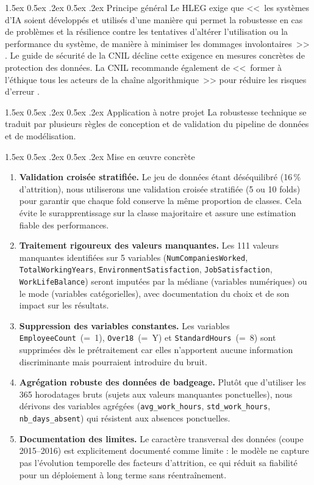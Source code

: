 \documentclass[12pt,a4paper]{article}
\makeatletter
\renewcommand\paragraph{\@startsection{paragraph}{4}{\z@}%
  {1.5ex \@plus 0.5ex \@minus .2ex}%
  {0.5ex \@plus .2ex}%
  {\normalfont\normalsize\bfseries}}
\makeatother
\begin{document}
\paragraph{Principe général}
Le HLEG exige que <<~les systèmes d'IA soient développés et utilisés d'une manière qui permet la robustesse en cas de problèmes et la résilience contre les tentatives d'altérer l'utilisation ou la performance du système, de manière à minimiser les dommages involontaires~>> \cite{ia_act}. Le guide de sécurité de la CNIL \cite{cnil_securite} décline cette exigence en mesures concrètes de protection des données. La CNIL recommande également de <<~former à l'éthique tous les acteurs de la chaîne algorithmique~>> pour réduire les risques d'erreur \cite{cnil_ethique}.

\paragraph{Application à notre projet}
La robustesse technique se traduit par plusieurs règles de conception et de validation du pipeline de données et de modélisation.

\paragraph{Mise en \oe uvre concrète}
\begin{enumerate}
    \item \textbf{Validation croisée stratifiée.} Le jeu de données étant déséquilibré (16\,\% d'attrition), nous utiliserons une validation croisée stratifiée (5 ou 10 folds) pour garantir que chaque fold conserve la même proportion de classes. Cela évite le surapprentissage sur la classe majoritaire et assure une estimation fiable des performances.
    \item \textbf{Traitement rigoureux des valeurs manquantes.} Les 111 valeurs manquantes identifiées sur 5 variables (\texttt{NumCompaniesWorked}, \texttt{TotalWorkingYears}, \texttt{EnvironmentSatisfaction}, \texttt{JobSatisfaction}, \texttt{WorkLifeBalance}) seront imputées par la médiane (variables numériques) ou le mode (variables catégorielles), avec documentation du choix et de son impact sur les résultats.
    \item \textbf{Suppression des variables constantes.} Les variables \texttt{EmployeeCount}~(=~1), \texttt{Over18}~(=~Y) et \texttt{StandardHours}~(=~8) sont supprimées dès le prétraitement car elles n'apportent aucune information discriminante mais pourraient introduire du bruit.
    \item \textbf{Agrégation robuste des données de badgeage.} Plutôt que d'utiliser les 365 horodatages bruts (sujets aux valeurs manquantes ponctuelles), nous dérivons des variables agrégées (\texttt{avg\_work\_hours}, \texttt{std\_work\_hours}, \texttt{nb\_days\_absent}) qui résistent aux absences ponctuelles.
    \item \textbf{Documentation des limites.} Le caractère transversal des données (coupe 2015--2016) est explicitement documenté comme limite : le modèle ne capture pas l'évolution temporelle des facteurs d'attrition, ce qui réduit sa fiabilité pour un déploiement à long terme sans réentraînement.
\end{enumerate}
\end{document}
